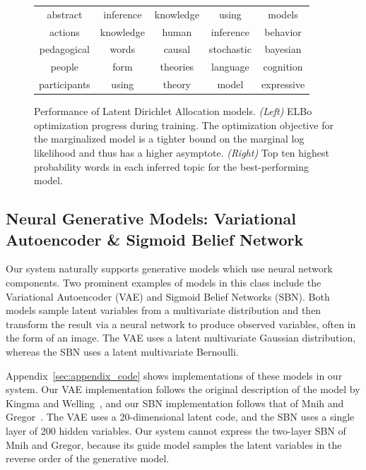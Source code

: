\begin{figure}[!ht]
\begin{minipage}{0.5\linewidth}
\begin{tabular}{c c c c c}
abstract & inference & knowledge & using & models\\
actions & knowledge & human & inference & behavior\\
pedagogical & words & causal & stochastic & bayesian\\
people & form & theories & language & cognition\\
participants & using & theory & model & expressive
\end{tabular}
\end{minipage}
%
\caption{Performance of Latent Dirichlet Allocation models. \emph{(Left)} ELBo optimization progress during training. The optimization objective for the marginalized model is a tighter bound on the marginal log likelihood and thus has a higher asymptote. \emph{(Right)} Top ten highest probability words in each inferred topic for the best-performing model.}
\label{fig:ldaResults}
\end{figure}

\subsection{Neural Generative Models: Variational Autoencoder \& Sigmoid Belief Network}
\label{sec:results_vae}

Our system naturally supports generative models which use neural network components. Two prominent examples of models in this class include the Variational Autoencoder (VAE) and Sigmoid Belief Networks (SBN). Both models sample latent variables from a multivariate distribution and then transform the result via a neural network to produce observed variables, often in the form of an image. The VAE uses a latent multivariate Gaussian distribution, whereas the SBN uses a latent multivariate Bernoulli.

Appendix~\ref{sec:appendix_code} shows implementations of these models in our system. Our VAE implementation follows the original description of the model by Kingma and Welling~\cite{AEVB}, and our SBN implementation follows that of Mnih and Gregor~\cite{NVIL}.
The VAE uses a 20-dimensional latent code, and the SBN uses a single layer of 200 hidden variables. Our system cannot express the two-layer SBN of Mnih and Gregor, because its guide model samples the latent variables in the reverse order of the generative model.

